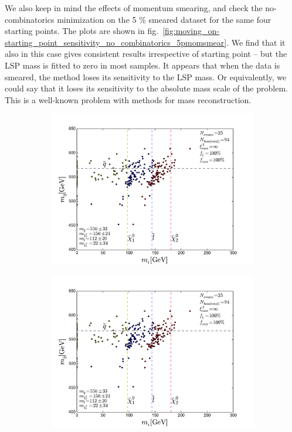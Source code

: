 \documentclass[twoside,english]{uiofysmaster}
\begin{document}
We also keep in mind the effects of momentum smearing, and check the no-combinatorics minimization on the 5 \% smeared dataset for the same four starting points. The plots are shown in fig.\ \ref{fig:moving_on-starting_point_sensitivity_no_combinatorics_5pmomsmear}. We find that it also in this case gives consistent results irrespective of starting point -- but the LSP mass is fitted to zero in most samples. It appears that when the data is smeared, the method loses its sensitivity to the LSP mass. Or equivalently, we could say that it loses its sensitivity to the absolute mass scale of the problem. This is a well-known problem with methods for mass reconstruction.
\begin{figure}[hbt]
	\centering
	\begin{subfigure}[b]{0.45\textwidth}
		\includegraphics[width=\textwidth]{figures/improving_combinatorics/herwigpp_5psmear_lowtol_nocomb_TMP.pdf} 
		\caption{ }
	\end{subfigure}
	\begin{subfigure}[b]{0.45\textwidth}
		\includegraphics[width=\textwidth]{figures/improving_combinatorics/herwigpp_5psmear_lowtol_nocomb_400-300-200-100.pdf}
		\caption{ } 
	\end{subfigure}


\end{figure}
\end{document}

